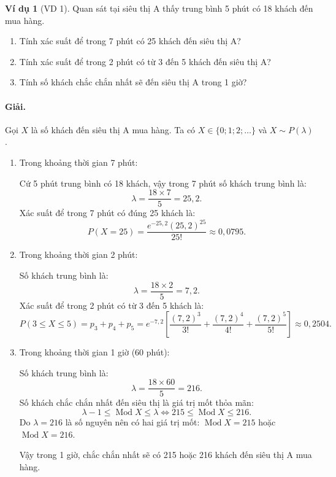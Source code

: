 \documentclass[12pt,a4paper]{article}
\theoremstyle{definition}
\newtheorem{vidu}{Ví dụ}[section]
\begin{document}
\begin{vidu}[VD 1]
Quan sát tại siêu thị A thấy trung bình 5 phút có 18 khách đến mua hàng.
\begin{enumerate}[label=\arabic*)]
    \item Tính xác suất để trong 7 phút có 25 khách đến siêu thị A?
    \item Tính xác suất để trong 2 phút có từ 3 đến 5 khách đến siêu thị A?
    \item Tính số khách chắc chắn nhất sẽ đến siêu thị A trong 1 giờ?
\end{enumerate}

\paragraph{Giải.}
Gọi $X$ là số khách đến siêu thị A mua hàng. Ta có $X \in \{0; 1; 2; \dots\}$ và $X \sim P(\lambda)$.

\begin{enumerate}[label=\arabic*)]
    \item Trong khoảng thời gian 7 phút:
    
    Cứ 5 phút trung bình có 18 khách, vậy trong 7 phút số khách trung bình là:
    \[
    \lambda = \frac{18 \times 7}{5} = 25{,}2.
    \]
    Xác suất để trong 7 phút có đúng 25 khách là:
    \[
    P(X = 25) = \frac{e^{-25{,}2} (25{,}2)^{25}}{25!} \approx 0{,}0795.
    \]

    \item Trong khoảng thời gian 2 phút:
    
    Số khách trung bình là:
    \[
    \lambda = \frac{18 \times 2}{5} = 7{,}2.
    \]
    Xác suất để trong 2 phút có từ 3 đến 5 khách là:
    \[
    P(3 \le X \le 5) = p_3 + p_4 + p_5 = e^{-7{,}2} \left[ \frac{(7{,}2)^3}{3!} + \frac{(7{,}2)^4}{4!} + \frac{(7{,}2)^5}{5!} \right] \approx 0{,}2504.
    \]

    \item Trong khoảng thời gian 1 giờ (60 phút):
    
    Số khách trung bình là:
    \[
    \lambda = \frac{18 \times 60}{5} = 216.
    \]
    Số khách chắc chắn nhất đến siêu thị là giá trị mốt thỏa mãn:
    \[
    \lambda - 1 \le \operatorname{Mod} X \le \lambda \iff 215 \le \operatorname{Mod} X \le 216.
    \]
    Do $\lambda = 216$ là số nguyên nên có hai giá trị mốt: $\operatorname{Mod} X = 215$ hoặc $\operatorname{Mod} X = 216$.
    
    Vậy trong 1 giờ, chắc chắn nhất sẽ có 215 hoặc 216 khách đến siêu thị A mua hàng.
\end{enumerate}
\end{vidu}
\end{document}
